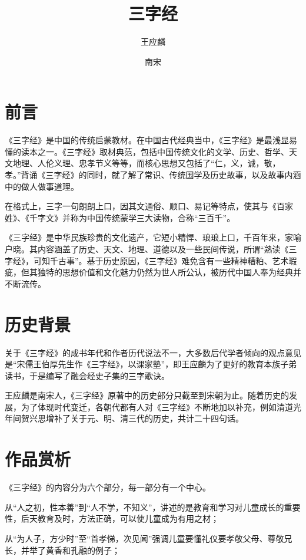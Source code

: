 \documentclass[a4paper,12pt,UTF8,twoside]{ctexbook}
\title{\heiti\zihao{0} 三字经}
\author{王应麟}
\date{南宋}
\begin{document}
\maketitle
\tableofcontents

\frontmatter
\chapter{前言}

《三字经》是中国的传统启蒙教材。在中国古代经典当中，《三字经》是最浅显易懂的读本之一。《三字经》取材典范，包括中国传统文化的文学、历史、哲学、天文地理、人伦义理、忠孝节义等等，而核心思想又包括了“仁，义，诚，敬，孝。”背诵《三字经》的同时，就了解了常识、传统国学及历史故事，以及故事内涵中的做人做事道理。

在格式上，三字一句朗朗上口，因其文通俗、顺口、易记等特点，使其与《百家姓》、《千字文》并称为中国传统蒙学三大读物，合称“三百千”。

《三字经》是中华民族珍贵的文化遗产，它短小精悍、琅琅上口，千百年来，家喻户晓。其内容涵盖了历史、天文、地理、道德以及一些民间传说，所谓“熟读《三字经》，可知千古事”。基于历史原因，《三字经》难免含有一些精神糟粕、艺术瑕疵，但其独特的思想价值和文化魅力仍然为世人所公认，被历代中国人奉为经典并不断流传。

\chapter{历史背景}

关于《三字经》的成书年代和作者历代说法不一，大多数后代学者倾向的观点意见是“宋儒王伯厚先生作《三字经》，以课家塾”，即王应麟为了更好的教育本族子弟读书，于是编写了融会经史子集的三字歌诀。

王应麟是南宋人，《三字经》原著中的历史部分只截至到宋朝为止。随着历史的发展，为了体现时代变迁，各朝代都有人对《三字经》不断地加以补充，例如清道光年间贺兴思增补了关于元、明、清三代的历史，共计二十四句话。

\chapter{作品赏析}

《三字经》的内容分为六个部分，每一部分有一个中心。

从“人之初，性本善”到“人不学，不知义”，讲述的是教育和学习对儿童成长的重要性，后天教育及时，方法正确，可以使儿童成为有用之材；

从“为人子，方少时”至“首孝悌，次见闻”强调儿童要懂礼仪要孝敬父母、尊敬兄长，并举了黄香和孔融的例子；
\end{document}
